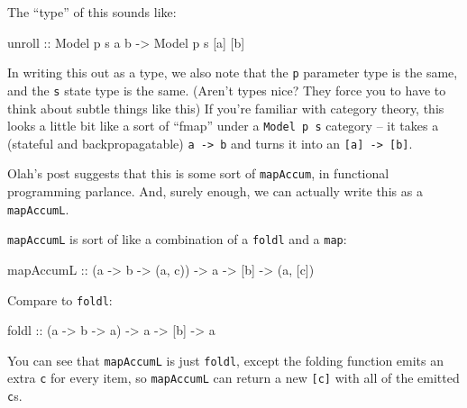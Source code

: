\documentclass[]{article}
\newenvironment{Shaded}{}{}
\newcommand{\DataTypeTok}[1]{\textcolor[rgb]{0.56,0.13,0.00}{#1}}
\newcommand{\FunctionTok}[1]{\textcolor[rgb]{0.02,0.16,0.49}{#1}}
\newcommand{\NormalTok}[1]{#1}
\newcommand{\OtherTok}[1]{\textcolor[rgb]{0.00,0.44,0.13}{#1}}
\begin{document}
The ``type'' of this sounds like:

\begin{Shaded}
\begin{Highlighting}[]
\OtherTok{unroll ::} \DataTypeTok{Model}\NormalTok{ p s a b }\OtherTok{{-}\textgreater{}} \DataTypeTok{Model}\NormalTok{ p s [a] [b]}
\end{Highlighting}
\end{Shaded}

In writing this out as a type, we also note that the \texttt{p} parameter type
is the same, and the \texttt{s} state type is the same. (Aren't types nice? They
force you to have to think about subtle things like this) If you're familiar
with category theory, this looks a little bit like a sort of ``fmap'' under a
\texttt{Model\ p\ s} category -- it takes a (stateful and backpropagatable)
\texttt{a\ -\textgreater{}\ b} and turns it into an
\texttt{{[}a{]}\ -\textgreater{}\ {[}b{]}}.

Olah's post suggests that this is some sort of \texttt{mapAccum}, in functional
programming parlance. And, surely enough, we can actually write this as a
\texttt{mapAccumL}.

\texttt{mapAccumL} is sort of like a combination of a \texttt{foldl} and a
\texttt{map}:

\begin{Shaded}
\begin{Highlighting}[]
\NormalTok{mapAccumL}
\OtherTok{    ::}\NormalTok{ (a }\OtherTok{{-}\textgreater{}}\NormalTok{ b }\OtherTok{{-}\textgreater{}}\NormalTok{ (a, c))}
    \OtherTok{{-}\textgreater{}}\NormalTok{ a}
    \OtherTok{{-}\textgreater{}}\NormalTok{ [b]}
    \OtherTok{{-}\textgreater{}}\NormalTok{ (a, [c])}
\end{Highlighting}
\end{Shaded}

Compare to \texttt{foldl}:

\begin{Shaded}
\begin{Highlighting}[]
\FunctionTok{foldl}
\OtherTok{    ::}\NormalTok{ (a }\OtherTok{{-}\textgreater{}}\NormalTok{ b }\OtherTok{{-}\textgreater{}}\NormalTok{ a)}
    \OtherTok{{-}\textgreater{}}\NormalTok{ a}
    \OtherTok{{-}\textgreater{}}\NormalTok{ [b]}
    \OtherTok{{-}\textgreater{}}\NormalTok{ a}
\end{Highlighting}
\end{Shaded}

You can see that \texttt{mapAccumL} is just \texttt{foldl}, except the folding
function emits an extra \texttt{c} for every item, so \texttt{mapAccumL} can
return a new \texttt{{[}c{]}} with all of the emitted \texttt{c}s.
\end{document}
